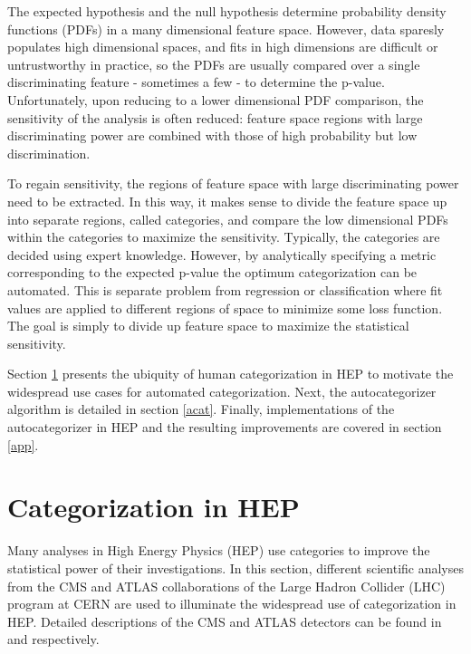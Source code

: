\documentclass[review]{elsarticle}
\begin{document}
The expected hypothesis and the null hypothesis determine probability density functions (PDFs) in a many dimensional feature space. However, data sparesly populates high dimensional spaces, and fits in high dimensions are difficult or untrustworthy in practice, so the PDFs are usually compared over a single discriminating feature - sometimes a few - to determine the p-value. Unfortunately, upon reducing to a lower dimensional PDF comparison, the sensitivity of the analysis is often reduced: feature space regions with large discriminating power are combined with those of high probability but low discrimination.

To regain sensitivity, the regions of feature space with large discriminating power need to be extracted. In this way, it makes sense to divide the feature space up into separate regions, called categories, and compare the low dimensional PDFs within the categories to maximize the sensitivity. Typically, the categories are decided using expert knowledge. However, by analytically specifying a metric corresponding to the expected p-value the optimum categorization can be automated. This is separate problem from regression or classification where fit values are applied to different regions of space to minimize some loss function. The goal is simply to divide up feature space to maximize the statistical sensitivity.

Section \ref{chep} presents the ubiquity of human categorization in HEP to motivate the widespread use cases for automated categorization. Next, the autocategorizer algorithm is detailed in section \ref{acat}. Finally, implementations of the autocategorizer in HEP and the resulting improvements are covered in section \ref{app}.

\section{Categorization in HEP}
\label{chep}


Many analyses in High Energy Physics (HEP) use categories to improve the statistical power of their investigations. In this section, different scientific analyses from the CMS and ATLAS collaborations of the Large Hadron Collider (LHC) program at CERN are used to illuminate the widespread use of categorization in HEP. Detailed descriptions of the CMS and ATLAS detectors can be found in \cite{cms} and \cite{atlas} respectively. 
\end{document}
